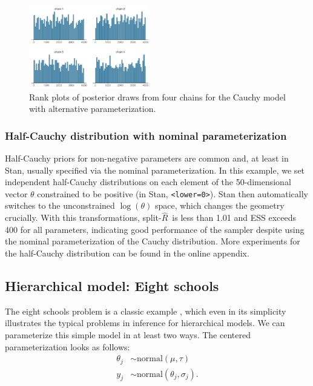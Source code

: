 \documentclass[american,]{article}
\newcommand{\sRhat}{split-$\widehat{R}$}
\theoremstyle{definition}
\begin{document}
\begin{figure}[tp]
  \centering
  \includegraphics[width=0.47\textwidth]{graphics/hist-fit-alt1-1.pdf}
  \caption{Rank plots of posterior draws from four chains for the Cauchy model with alternative parameterization.}
  \label{fig:hist-fit-alt1-1}
\end{figure}

\hypertarget{half-cauchy-distribution-with-nominal-parameterization}{%
\subsubsection*{Half-Cauchy distribution with nominal
parameterization}\label{half-cauchy-distribution-with-nominal-parameterization}}

Half-Cauchy priors for non-negative parameters are common and, at least in Stan, 
usually specified via the nominal parameterization.
In this example, we set independent half-Cauchy distributions on each element
of the 50-dimensional vector $\theta$ constrained to be positive
(in Stan, \texttt{\textless{}lower=0\textgreater{}}). Stan then
automatically switches to the unconstrained \(\log(\theta)\) space, which
changes the geometry crucially. With this transformations, \sRhat\ is less than 1.01 and ESS exceeds 400 for all parameters, indicating good performance of the sampler despite using the nominal parameterization of
the Cauchy distribution. More experiments for the half-Cauchy distribution 
can be found in the online appendix.




\hypertarget{eightschools}{%
\subsection{Hierarchical model: Eight schools}\label{eightschools}}

The eight schools problem is a classic example
\citep[see Section 5.5 in][]{BDA3}, which even in its
simplicity illustrates the typical problems in inference for
hierarchical models. We can parameterize this simple model
in at least two ways. The centered parameterization looks as follows:
\begin{align*}
\theta_j &\sim \text{normal}(\mu, \tau) \\
y_j &\sim \text{normal}(\theta_j, \sigma_j).
\end{align*}
\end{document}
